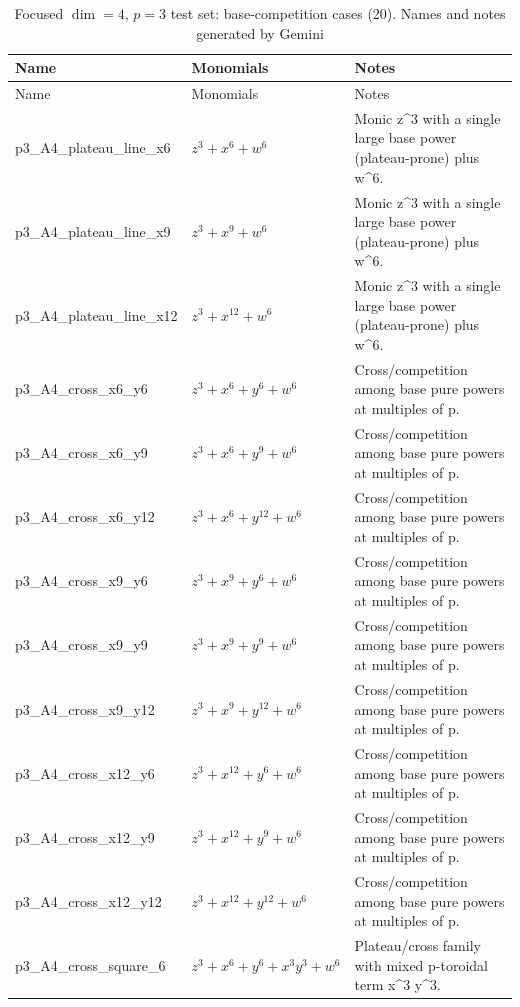 \documentclass[11pt]{amsart}
\begin{document}
\begin{longtable}{@{}p{} p{} p{}@{}}
\caption{Focused $\dim=4$, $p=3$ test set: base-competition cases (20). Names and notes generated by Gemini}\label{tab:focused20}\\
\toprule
Name & Monomials & Notes \\
\midrule
\endfirsthead
\toprule
Name & Monomials & Notes \\
\midrule
\endhead
p3\_A4\_plateau\_line\_x6 & $z^{3} + x^{6} + w^{6}$ & Monic z\textasciicircum{}3 with a single large base power (plateau-prone) plus w\textasciicircum{}6. \\
p3\_A4\_plateau\_line\_x9 & $z^{3} + x^{9} + w^{6}$ & Monic z\textasciicircum{}3 with a single large base power (plateau-prone) plus w\textasciicircum{}6. \\
p3\_A4\_plateau\_line\_x12 & $z^{3} + x^{12} + w^{6}$ & Monic z\textasciicircum{}3 with a single large base power (plateau-prone) plus w\textasciicircum{}6. \\
p3\_A4\_cross\_x6\_y6 & $z^{3} + x^{6} + y^{6} + w^{6}$ & Cross/competition among base pure powers at multiples of p. \\
p3\_A4\_cross\_x6\_y9 & $z^{3} + x^{6} + y^{9} + w^{6}$ & Cross/competition among base pure powers at multiples of p. \\
p3\_A4\_cross\_x6\_y12 & $z^{3} + x^{6} + y^{12} + w^{6}$ & Cross/competition among base pure powers at multiples of p. \\
p3\_A4\_cross\_x9\_y6 & $z^{3} + x^{9} + y^{6} + w^{6}$ & Cross/competition among base pure powers at multiples of p. \\
p3\_A4\_cross\_x9\_y9 & $z^{3} + x^{9} + y^{9} + w^{6}$ & Cross/competition among base pure powers at multiples of p. \\
p3\_A4\_cross\_x9\_y12 & $z^{3} + x^{9} + y^{12} + w^{6}$ & Cross/competition among base pure powers at multiples of p. \\
p3\_A4\_cross\_x12\_y6 & $z^{3} + x^{12} + y^{6} + w^{6}$ & Cross/competition among base pure powers at multiples of p. \\
p3\_A4\_cross\_x12\_y9 & $z^{3} + x^{12} + y^{9} + w^{6}$ & Cross/competition among base pure powers at multiples of p. \\
p3\_A4\_cross\_x12\_y12 & $z^{3} + x^{12} + y^{12} + w^{6}$ & Cross/competition among base pure powers at multiples of p. \\
p3\_A4\_cross\_square\_6 & $z^{3} + x^{6} + y^{6} + x^{3}y^{3} + w^{6}$ & Plateau/cross family with mixed p-toroidal term x\textasciicircum{}3 y\textasciicircum{}3. \\

\end{longtable}
\end{document}
